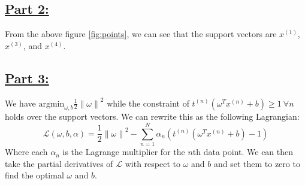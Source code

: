 \documentclass[20pt]{article}
\begin{document}
\newpage

\subsection*{\underline{Part 2:}}
From the above figure \ref{fig:points}, we can see that the support vectors are $x^{(1)}$, $x^{(3)}$, and $x^{(4)}$.
\newpage

\subsection*{\underline{Part 3:}}
We have $\text{argmin}_{\omega,b} \frac{1}{2}\left\lVert \omega \right\rVert^2$ while the constraint of $t^{(n)}(\omega^Tx^{(n)}+b) \geq 1 \ \forall n$ holds over the support vectors. We can rewrite this as the following Lagrangian:
\begin{equation}
    \label{eqn:Lagrangian}
    \mathcal{L} (\omega,b,\alpha) = \frac{1}{2}\left\lVert \omega \right\rVert^2 - \sum_{n=1}^{N} \alpha_n \left( t^{(n)}(\omega^Tx^{(n)}+b) - 1 \right)
\end{equation}
Where each $\alpha_n$ is the Lagrange multiplier for the $n$th data point. We can then take the partial derivatives of $\mathcal{L}$ with respect to $\omega$ and $b$ and set them to zero to find the optimal $\omega$ and $b$.
\newpage
\end{document}
